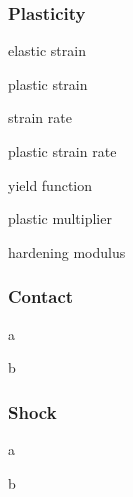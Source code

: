 \subsubsection*{Plasticity}

\begin{description}[noitemsep,align=right,labelwidth=1.5cm,labelsep=0.8cm]
\item [$\hstraine$] elastic strain 
\item [$\hstrainp$] plastic strain
\item
\item [$\hstraindot$] strain rate
\item [$\hstrainpdot$] plastic strain rate
\item
\item [$\Phi$] yield function
\item 
\item [$\gammadot$] plastic multiplier
\item [$H$] hardening modulus
\end{description}

\subsubsection*{Contact}

\begin{description}[noitemsep,align=right,labelwidth=1.5cm,labelsep=0.8cm]
\item [a] a
\item [b] b
\end{description}


\subsubsection*{Shock}

\begin{description}[noitemsep,align=right,labelwidth=1.5cm,labelsep=0.8cm]
\item [a] a
\item [b] b
\end{description}


\clearpage









